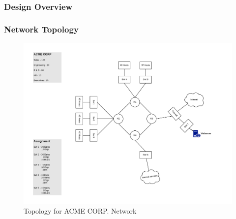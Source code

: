 \subsubsection{Design Overview}
\subsubsection{Network Topology}
\begin{figure}[!htb]
	\includegraphics[width=\textwidth]{images/networktopology.png}
	\caption{Topology for ACME CORP. Network}
\end{figure}
